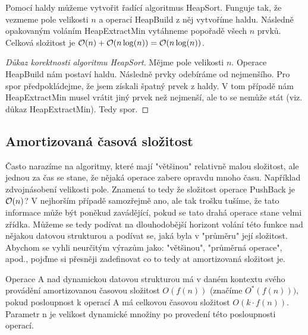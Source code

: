 Pomocí haldy můžeme vytvořit řadící algoritmus HeapSort. Funguje tak, že vezmeme pole velikosti $n$ a operací HeapBuild z něj vytvoříme haldu. Následně opakovaným voláním HeapExtractMin vytáhneme popořadě všech $n$ prvků. Celková složitost je $\mathcal{O}(n) + \mathcal{O}(n\log(n)) = \mathcal{O}(n\log(n))$. \bigskip

\begin{proof}[Důkaz korektnosti algoritmu HeapSort]
    Mějme pole velikosti $n$. Operace HeapBuild nám postaví haldu. Následně prvky odebíráme od nejmenšího. Pro spor předpokládejme, že jsem získali špatný prvek z haldy. V tom případě nám HeapExtractMin musel vrátit jiný prvek než nejmenší, ale to se nemůže stát (viz. důkaz HeapExtractMin). Tedy spor.
\end{proof}

\newpage

\subsection{Amortizovaná časová složitost}

 Často narazíme na algoritmy, které mají "většinou" relativně malou složitost, ale jednou za čas se stane, že nějaká operace zabere opravdu mnoho času. Například zdvojnásobení velikosti pole. Znamená to tedy že složitost operace PushBack je $\mathcal{O}(n)$? V nejhorším případě samozřejmě ano, ale tak trošku tušíme, že tato informace může být poněkud zavádějící, pokud se tato drahá operace stane velmi zřídka. Můžeme se tedy podívat na dlouhodobější horizont volání této funkce nad nějakou datovou strukturou a podívat se, jaká byla v "průměru" její složitost.\\

 \noindent Abychom se vyhli neurčitým výrazům jako: "většinou", "průměrná operace", apod., pojďme si přesněji zadefinovat co to tedy at amortizovaná složitost je.

\begin{definition}
Operace A nad dynamickou datovou strukturou má v daném kontextu svého provádění amortizovanou časovou složitost $O(f(n))$ (značíme $O^*(f(n)))$, pokud posloupnost k operací A má celkovou časovou složitost $O(k \cdot f(n))$. Parametr n je velikost dynamické množiny po provedení této posloupnosti operací.
\end{definition}\bigskip

